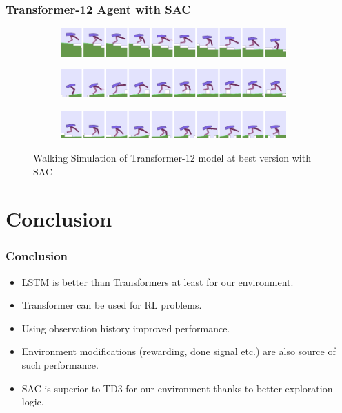 \documentclass{beamer}
\begin{document}
\begin{frame}
\frametitle{Transformer-12 Agent with SAC}
\begin{figure}[!ht]
	\centering
	\begin{subfigure}{.95\textwidth}
		\centering
		\includegraphics[width=0.95\textwidth]{figures/bipedal/anim/trsf-12-stairs.png}
		\label{fig:anim_trsf_stairs}
	\end{subfigure}
	\begin{subfigure}{.95\textwidth}
		\centering
		\includegraphics[width=0.95\textwidth]{figures/bipedal/anim/trsf-12-hurdle.png}
		\label{fig:anim_trsf_hurdle}
	\end{subfigure}
	\begin{subfigure}{.95\textwidth}
		\centering
		\includegraphics[width=0.95\textwidth]{figures/bipedal/anim/trsf-12-pitfall.png}
		\label{fig:anim_trsf_pitfall}
	\end{subfigure}
	\caption{Walking Simulation of Transformer-12 model at best version with SAC}
	\label{fig:trsf_simulation}
\end{figure}
\end{frame}

\section{Conclusion}
\begin{frame}
\frametitle{Conclusion}
\begin{itemize}
	\item LSTM is better than Transformers at least for our environment.
	\item Transformer can be used for RL problems.
	\item Using observation history improved performance.
	\item Environment modifications (rewarding, done signal etc.) are also source of such performance. 
	\item SAC is superior to TD3 for our environment thanks to better exploration logic.
\end{itemize}
\end{frame}
\end{document}
